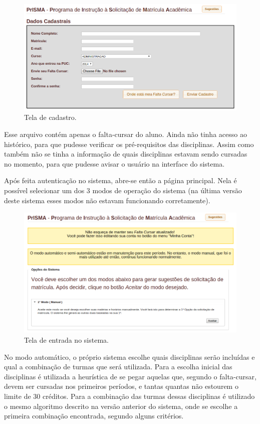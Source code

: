 \documentclass[graduacao,brazil]{ThesisPUC}
\begin{document}
\begin{figure}[H]
    \centering
    \includegraphics[width=\linewidth]{img/v2_cadastro.png}
    \caption{Tela de cadastro.}
\end{figure}

Esse arquivo contém apenas o falta-cursar do aluno. Ainda não tinha acesso ao histórico, para que pudesse verificar os pré-requisitos das disciplinas. Assim como também não se tinha a informação de quais disciplinas estavam sendo cursadas no momento, para que pudesse avisar o usuário na interface do sistema.

Após feita autenticação no sistema, abre-se então a página principal. Nela é possível selecionar um dos 3 modos de operação do sistema (na última versão deste sistema esses modos não estavam funcionando corretamente).

\begin{figure}[H]
    \centering
    \includegraphics[width=\linewidth]{img/v2_main.png}
    \caption{Tela de entrada no sistema.}
\end{figure}

No modo automático, o próprio sistema escolhe quais disciplinas serão incluídas e qual a combinação de turmas que será utilizada. Para a escolha inicial das disciplinas é utilizada a heurística de se pegar aquelas que, segundo o falta-cursar, devem ser cursadas nos primeiros períodos, e tantas quantas não estourem o limite de 30 créditos. Para a combinação das turmas dessas disciplinas é utilizado o mesmo algoritmo descrito na versão anterior do sistema, onde se escolhe a primeira combinação encontrada, segundo alguns critérios.
\end{document}
